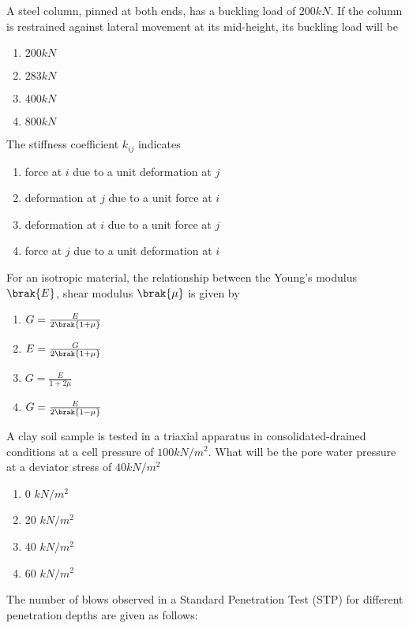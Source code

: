 	A steel column, pinned at both ends, has a buckling load of $200 kN$. If the column is restrained against lateral movement at its mid-height, its buckling load will be 
		\begin{enumerate}
			\item $200 kN$
			\item $283 kN$
			\item $400 kN$
			\item $800 kN$
		\end{enumerate}
	\item
	The stiffness coefficient $k_{ij}$ indicates
		\begin{enumerate}
			\item force at $i$ due to a unit deformation at $j$
			\item deformation at $j$ due to a unit force at $i$
			\item deformation at $i$ due to a unit force at $j$
			\item force at $j$ due to a unit deformation at $i$
		\end{enumerate}
	\item
	For an isotropic material, the relationship between the Young's modulus $\brak{E}$, shear modulus $\brak{\mu}$ is given by 
		\begin{enumerate}
			\item $G = \frac{E}{2\brak{1+\mu}}$
			\item $E = \frac{G}{2\brak{1+\mu}}$
			\item $G = \frac{E}{1 + 2\mu}$
			\item $G = \frac{E}{2\brak{1-\mu}}$
		\end{enumerate}
	\item
	A clay soil sample is tested in a triaxial apparatus in consolidated-drained conditions at a cell pressure of $100 kN/m^2$. What will be the pore water pressure at a deviator stress of $40 kN/m^2$
		\begin{enumerate}
			\item 0 $kN/m^2$
			\item 20 $kN/m^2$
			\item 40 $kN/m^2$
			\item 60 $kN/m^2$
		\end{enumerate}
	\item
	The number of blows observed in a Standard Penetration Test (STP) for different penetration depths are given as follows: \\
	
    		 
       
